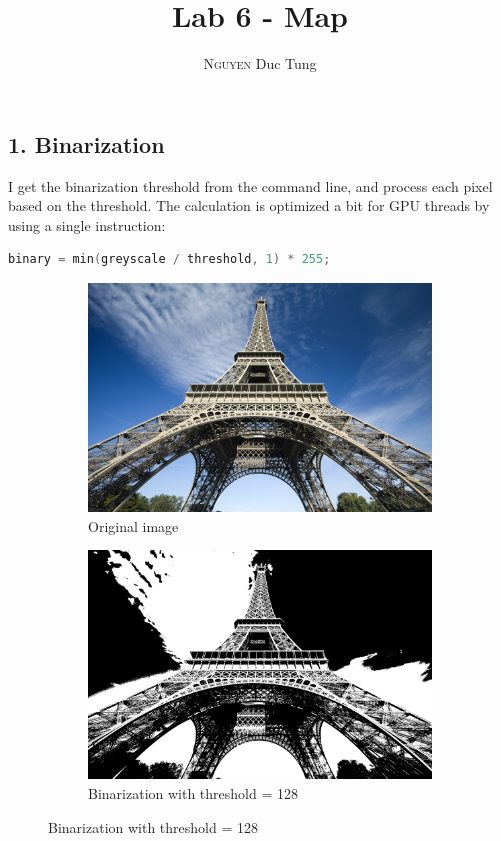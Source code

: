 \documentclass[12pt]{article}
\title{Lab 6 - Map}
\author{\textsc{Nguyen} Duc Tung}
\date{}
\begin{document}
\maketitle

\subsection*{1. Binarization}

I get the binarization threshold from the command line, and process each pixel based on the threshold. The calculation is optimized a bit for GPU threads by using a single instruction:

\begin{lstlisting}[language=C]
binary = min(greyscale / threshold, 1) * 255;
\end{lstlisting}

\begin{figure}[H]
  \centering
  \begin{subfigure}{.45\textwidth}
    \includegraphics[width=\linewidth]{./img/origin.jpg}
    \caption{Original image}
  \end{subfigure}
  \hspace{1cm}
  \begin{subfigure}{.45\textwidth}
    \includegraphics[width=\linewidth]{./img/6a.jpg}
    \caption{Binarization with threshold = 128}
  \end{subfigure}
\end{figure}
\end{document}
